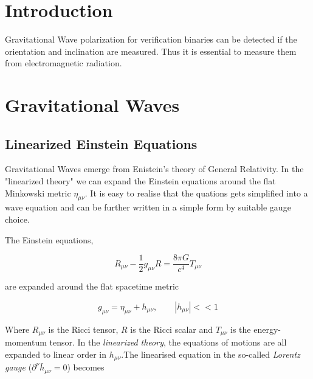 \documentclass[12pt,a4paper,oneside]{book}
\begin{document}
\newpage
\thispagestyle{empty}
\newpage




\section*{Introduction}

 Gravitational Wave polarization for verification binaries can be detected if the orientation and inclination are measured. Thus it is essential to measure them from electromagnetic radiation.


\section*{Gravitational Waves}

\subsection*{Linearized Einstein Equations}

Gravitational Waves emerge from Enistein's theory of General Relativity. In the "linearized theory" we can expand the Einstein equations around the flat Minkowski metric $\eta_{\mu \nu}$. It is easy to realise that the quations gets simplified into a wave equation and can be further written in a simple form by suitable gauge choice.

The Einstein equations,

\begin{equation}
\label{eq:Einstein-eq}
R_{\mu \nu} - \frac{1}{2} g_{\mu \nu} R = \frac{8 \pi G}{c^4} T_{\mu \nu}
\end{equation}

are expanded around the flat spacetime metric

\begin{equation}
\label{lingmunu}
g_{\mu \nu} = \eta_{\mu \nu} + h_{\mu \nu}, \qquad |h_{\mu \nu}| << 1
\end{equation}

Where $R_{\mu \nu}$ is the Ricci tensor, $R$ is the Ricci scalar and $T_{\mu \nu}$ is the energy-momentum tensor. In the \textit{linearized theory}, the equations of motions are all expanded to linear order in $h_{\mu \nu}$.The linearised equation in the so-called \emph{Lorentz gauge} ($\partial^{\nu} \bar{h}_{\mu \nu} = 0$) becomes
\end{document}
